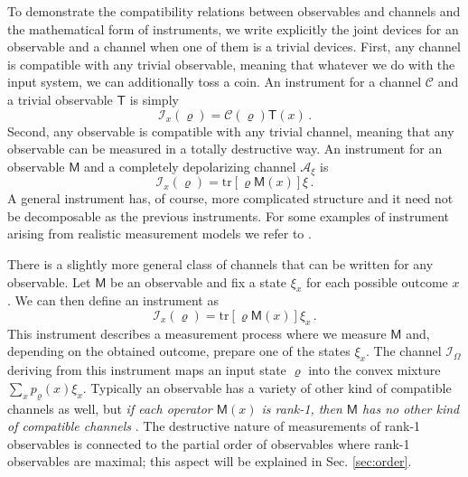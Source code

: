 \documentclass[12pt]{article}
\theoremstyle{definition}
\newcommand{\tr}[1]{\textrm{tr}\left[#1\right]} %
\newcommand{\Mo}{\mathsf{M}}%
\newcommand{\To}{\mathsf{T}}%
\newcommand{\Cc}{\mathcal{C}} %
\newcommand{\Ac}{\mathcal{A}} %
\newcommand{\Ii}{\mathcal{I}}
\begin{document}
{To demonstrate the compatibility relations between observables and  channels and the mathematical form of instruments, we write explicitly the joint devices for an observable and a channel when one of them is a trivial devices.
First, any channel is compatible with any trivial observable, meaning that whatever we do with the input system, we can additionally toss a coin.
An instrument for a channel $\Cc$ and a trivial observable $\To$ is simply
\begin{equation}\label{eq:instrument-trivial}
\Ii_x(\varrho)= \Cc(\varrho) \To(x) \, .
\end{equation}
Second, any observable is compatible with any trivial channel, meaning that any observable can be measured in a totally destructive way.
An instrument for an observable $\Mo$ and a completely depolarizing channel $\Ac_\xi$ is
\begin{equation}\label{eq:instrument-with-dc}
\Ii_x(\varrho)= \tr{\varrho \Mo(x)} \xi \, .
\end{equation}
A general instrument has, of course, more complicated structure and it need not be decomposable as the previous instruments.
For some examples of instrument arising from realistic measurement models we refer to \cite{OQP97}.  

There is a slightly more general class of channels that can be written for any observable. 
Let $\Mo$ be an observable and fix a state $\xi_x$ for each possible outcome $x$.
We can then define an instrument as
\begin{equation}
\Ii_x(\varrho)= \tr{\varrho \Mo(x)} \xi_x \, .
\end{equation}
This instrument describes a measurement process where we measure  $\Mo$ and, depending on the obtained outcome, prepare one of the states $\xi_x$.
The channel $\Ii_\Omega$ deriving from this instrument maps an input state $\varrho$ into the convex mixture $\sum_x p_\varrho(x) \xi_x$.
Typically an observable has a variety of other kind of compatible channels as well, but \emph{if each operator $\Mo(x)$ is rank-1, then $\Mo$ has no other kind of compatible channels} \cite{HeWo10}.
The destructive nature of measurements of rank-1 observables is connected to the partial order of observables where rank-1 observables are maximal; this aspect will be explained in Sec. \ref{sec:order}.

}
\end{document}
